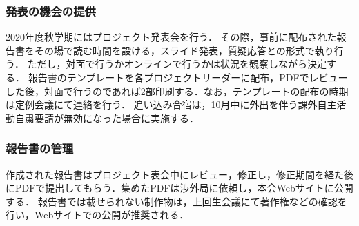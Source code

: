 \subsubsection* {発表の機会の提供}

2020年度秋学期にはプロジェクト発表会を行う．
その際，事前に配布された報告書をその場で読む時間を設ける，スライド発表，質疑応答との形式で執り行う．
ただし，対面で行うかオンラインで行うかは状況を観察しながら決定する．
報告書のテンプレートを各プロジェクトリーダーに配布，PDFでレビューした後，対面で行うのであれば2部印刷する．なお，テンプレートの配布の時期は定例会議にて連絡を行う．
追い込み合宿は，10月中に外出を伴う課外自主活動自粛要請が無効になった場合に実施する．

\subsubsection* {報告書の管理}

作成された報告書はプロジェクト表会中にレビュー，修正し，修正期間を経た後にPDFで提出してもらう．集めたPDFは渉外局に依頼し，本会Webサイトに公開する．
報告書では載せられない制作物は，上回生会議にて著作権などの確認を行い，Webサイトでの公開が推奨される．
